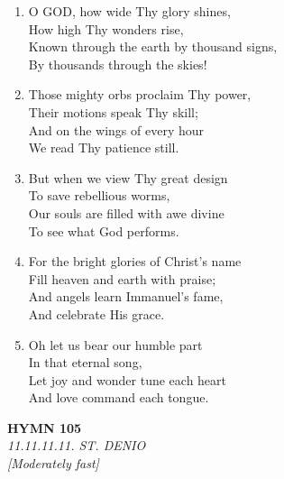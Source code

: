 \begin{enumerate}
    \item O GOD, how wide Thy glory shines, \\
        How high Thy wonders rise, \\
        Known through the earth by thousand signs, \\
        By thousands through the skies!

    \item Those mighty orbs proclaim Thy power, \\
        Their motions speak Thy skill; \\
        And on the wings of every hour \\
        We read Thy patience still.

    \item But when we view Thy great design \\
        To save rebellious worms, \\
        Our souls are filled with awe divine \\
        To see what God performs.

    \item For the bright glories of Christ's name \\
        Fill heaven and earth with praise; \\
        And angels learn Immanuel's fame, \\
        And celebrate His grace.

    \item Oh let us bear our humble part \\
        In that eternal song, \\
        Let joy and wonder tune each heart \\
        And love command each tongue.

\end{enumerate}

\newpage
\begin{center}
    {\Large \textbf{HYMN 105}}
    \\
    \textit{11.11.11.11. ST. DENIO}
    \\
    \textit{\small [Moderately fast]}
\end{center}
\vspace{1em}

